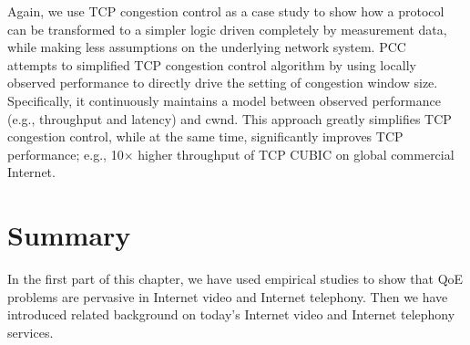 \noindent\underline{}
Again, we use TCP congestion control as a case study to show
how a protocol can be transformed to a simpler logic driven
completely by measurement data, while making less
assumptions on the underlying network system.
PCC~\cite{pcc} attempts to simplified TCP congestion 
control algorithm by using locally observed performance 
to directly drive the setting of congestion window size. 
Specifically, it continuously maintains a model between 
observed performance (e.g., throughput and latency) 
and cwnd. This approach greatly simplifies TCP congestion
control, while at the same time, significantly 
improves TCP performance; e.g., 10$\times$ higher
throughput of TCP CUBIC on global commercial Internet.




%
%
%
%


\section{Summary}

In the first part of this chapter, we have used empirical studies 
to show that QoE problems are pervasive in Internet video and Internet 
telephony. Then we have introduced related background on today's 
Internet video and Internet telephony services.

